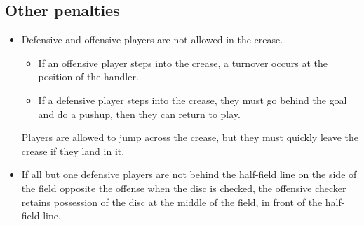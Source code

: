 \documentclass[10pt]{article}
\begin{document}
\subsection{Other penalties}
\begin{itemize}
    \item Defensive and offensive players are not allowed in the crease.
        \begin{itemize}
            \item If an offensive player steps into the crease, a turnover occurs at the position of the handler.
            \item If a defensive player steps into the crease, they must go behind the goal and do a pushup, then they can return to play.
        \end{itemize}
        Players are allowed to jump across the crease, but they must quickly leave the crease if they land in it.
    \item If all but one defensive players are not behind the half-field line on the side of the field opposite the offense when the disc is checked, the offensive checker retains possession of the disc at the middle of the field, in front of the half-field line.
\end{itemize}
\end{document}
